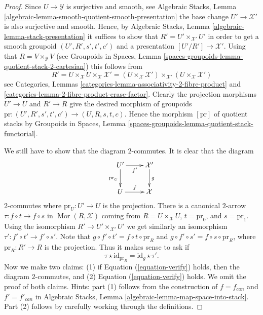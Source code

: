 \documentclass{stacks-project}
\theoremstyle{plain}
\theoremstyle{definition}
\theoremstyle{remark}
\numberwithin{equation}{subsection}
\def\Mor{\mathop{\mathrm{Mor}}\nolimits}
\begin{document}
\begin{proof}
Since $U \to \mathcal{Y}$ is surjective and smooth, see
Algebraic Stacks,
Lemma \ref{algebraic-lemma-smooth-quotient-smooth-presentation}
the base change $U' \to \mathcal{X}'$ is also surjective and smooth.
Hence, by
Algebraic Stacks,
Lemma \ref{algebraic-lemma-stack-presentation}
it suffices to show that $R' = U' \times_{\mathcal{X}'} U'$ in order to
get a smooth groupoid $(U', R', s', t', c')$ and a presentation
$[U'/R'] \to \mathcal{X}'$.
Using that $R = V \times_\mathcal{Y} V$ (see
Groupoids in Spaces,
Lemma \ref{spaces-groupoids-lemma-quotient-stack-2-cartesian})
this follows from
$$
R' =
U \times_\mathcal{X} U \times_\mathcal{X} \mathcal{X}' =
(U \times_\mathcal{X} \mathcal{X}')
\times_{\mathcal{X}'}
(U \times_\mathcal{X} \mathcal{X}')
$$
see
Categories, Lemmas \ref{categories-lemma-associativity-2-fibre-product} and
\ref{categories-lemma-2-fibre-product-erase-factor}.
Clearly the projection morphisms $U' \to U$ and $R' \to R$ give the
desired morphism of groupoids
$\text{pr} : (U', R', s', t', c') \to (U, R, s, t, c)$.
Hence the morphism $[\text{pr}]$ of quotient stacks by
Groupoids in Spaces,
Lemma \ref{spaces-groupoids-lemma-quotient-stack-functorial}.

\medskip\noindent
We still have to show that the diagram $2$-commutes.
It is clear that the diagram
$$
\xymatrix{
U' \ar[d]_{\text{pr}_U} \ar[r]_{f'} & \mathcal{X}' \ar[d]^g \\
U \ar[r]^f & \mathcal{X}
}
$$
$2$-commutes where $\text{pr}_U : U' \to U$ is the projection.
There is a canonical $2$-arrow
$\tau : f \circ t \to f \circ s$ in $\Mor(R, \mathcal{X})$
coming from $R = U \times_\mathcal{X} U$, $t = \text{pr}_0$, and
$s = \text{pr}_1$. Using the isomorphism
$R' \to U' \times_{\mathcal{X}'} U'$ we get similarly an isomorphism
$\tau' : f' \circ t' \to f' \circ s'$. Note that
$g \circ f' \circ t' = f \circ t \circ \text{pr}_R$ and
$g \circ f' \circ s' = f \circ s \circ \text{pr}_R$, where
$\text{pr}_R : R' \to R$ is the projection. Thus it makes sense to ask
if
\begin{equation}
\label{equation-verify}
\tau \star \text{id}_{\text{pr}_R} = \text{id}_g \star \tau'.
\end{equation}
Now we make two claims: (1) if Equation (\ref{equation-verify}) holds,
then the diagram $2$-commutes, and (2) Equation (\ref{equation-verify}) holds.
We omit the proof of both claims. Hints: part (1) follows from the
construction of $f = f_{can}$ and $f' = f'_{can}$ in
Algebraic Stacks, Lemma \ref{algebraic-lemma-map-space-into-stack}.
Part (2) follows by carefully working through the definitions.
\end{proof}
\end{document}
